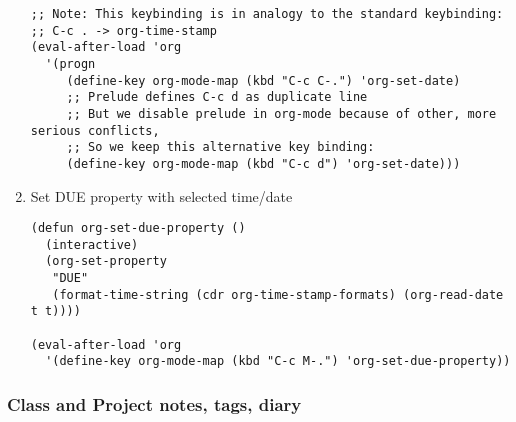 \documentclass[nofonts]{tufte-handout}
\begin{document}
\begin{enumerate}
\begin{verbatim}
;; Note: This keybinding is in analogy to the standard keybinding:
;; C-c . -> org-time-stamp
(eval-after-load 'org
  '(progn
     (define-key org-mode-map (kbd "C-c C-.") 'org-set-date)
     ;; Prelude defines C-c d as duplicate line
     ;; But we disable prelude in org-mode because of other, more serious conflicts,
     ;; So we keep this alternative key binding:
     (define-key org-mode-map (kbd "C-c d") 'org-set-date)))
\end{verbatim}

\item Set DUE property with selected time/date
\label{sec-2-5-8-6}

\begin{verbatim}
(defun org-set-due-property ()
  (interactive)
  (org-set-property
   "DUE"
   (format-time-string (cdr org-time-stamp-formats) (org-read-date t t))))

(eval-after-load 'org
  '(define-key org-mode-map (kbd "C-c M-.") 'org-set-due-property))
\end{verbatim}
\end{enumerate}

\subsubsection{Class and Project notes, tags, diary}
\label{sec-2-5-9}
\end{document}
